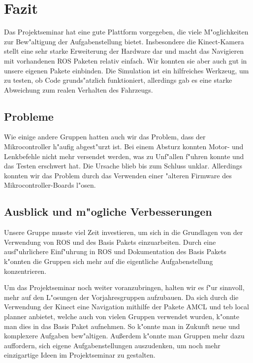 \section{Fazit}

Das Projektseminar hat eine gute Plattform vorgegeben, die viele M"oglichkeiten zur Bew"altigung der Aufgabenstellung 
bietet. Insbesondere die Kinect-Kamera stellt eine sehr
starke Erweiterung der Hardware dar und macht das Navigieren mit vorhandenen ROS Paketen relativ einfach.
Wir konnten sie aber auch gut in unsere eigenen Pakete einbinden. Die Simulation ist ein hilfreiches Werkzeug, um zu testen, ob Code grunds"atzlich funktioniert, allerdings gab es eine starke Abweichung zum realen Verhalten des Fahrzeugs.		

 

\subsection{Probleme}

Wie einige andere Gruppen hatten auch wir das Problem, dass der Mikrocontroller h"aufig abgest"urzt ist. Bei einem Absturz konnten Motor- und Lenkbefehle nicht mehr versendet werden, was zu Unf"allen f"uhren konnte und das Testen erschwert hat.
Die Ursache blieb bis zum Schluss unklar. Allerdings konnten wir das Problem durch das Verwenden einer "alteren Firmware des Mikrocontroller-Boards l"osen.



\subsection{Ausblick und m"ogliche Verbesserungen}

Unsere Gruppe musste viel Zeit investieren, um sich in die Grundlagen von der Verwendung von ROS und des Basis Pakets einzuarbeiten. 
Durch eine ausf"uhrlichere Einf"uhrung in ROS und Dokumentation des Basis Pakets k"onnten die Gruppen sich mehr auf die eigentliche Aufgabenstellung
konzentrieren.

Um das Projektseminar noch weiter voranzubringen, halten wir es f"ur sinnvoll, mehr auf den L"osungen der Vorjahresgruppen aufzubauen.
Da sich durch die Verwendung der Kinect eine Navigation mithilfe der Pakete AMCL und teb local planner anbietet, welche auch von vielen Gruppen verwendet wurden,
k"onnte man dies in das Basis Paket aufnehmen. So k"onnte man in Zukunft neue und komplexere Aufgaben bew"altigen.
Au{\ss}erdem k"onnte man Gruppen mehr dazu auffordern, sich eigene Aufgabenstellungen auszudenken, um noch mehr einzigartige Ideen im Projektseminar zu gestalten.
